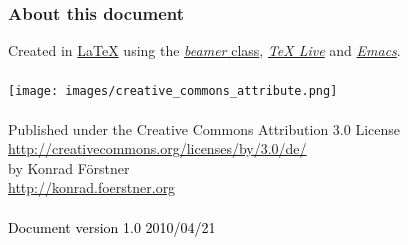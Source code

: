 \documentclass{beamer}
\begin{document}
\begin{frame}
  \frametitle{About this document} 
  \begin{center}
    {\tiny
      Created in \href{http://www.latex-project.org}{\LaTeX} using the
      \href{http://latex-beamer.sourceforge.net}{\textit{beamer}
        class}, \href{http://www.tug.org/texlive/}{\textit{TeX Live}} and
      \href{http://www.gnu.org/software/emacs}{\textit{Emacs}}.\\ \ \\

      \texttt{[image: images/creative\_commons\_attribute.png]}
      \ \\ \ \\
      Published under the Creative Commons Attribution 3.0 License\\
      \url{http://creativecommons.org/licenses/by/3.0/de/}\\
      by Konrad Förstner\\ 
      \url{http://konrad.foerstner.org}\\ \ \\
  }
  {\tiny \textcolor{black}{Document version 1.0 2010/04/21}}
  \end{center}
\end{frame}
\end{document}
